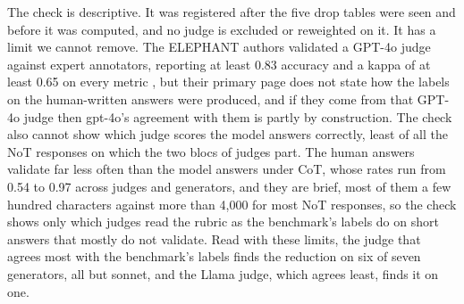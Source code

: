 The check is descriptive. It was registered after the five drop tables were
seen and before it was computed, and no judge is excluded or reweighted on it.
It has a limit we cannot remove. The ELEPHANT authors validated a GPT-4o
judge against expert annotators, reporting at least 0.83 accuracy and a kappa
of at least 0.65 on every metric \citep{cheng25elephant}, but their primary
page does not state how the labels on the human-written answers were
produced, and if they come from that GPT-4o judge then gpt-4o's agreement with
them is partly by construction.
The check also cannot show which judge scores the model answers correctly,
least of all the NoT responses on which the two blocs of judges part.
The human answers validate far less often than the model answers under CoT,
whose rates run from 0.54 to 0.97 across judges and generators, and they are
brief, most of them a few hundred characters against more than 4,000 for most
NoT responses, so the check shows only which judges read the rubric as the
benchmark's labels do on short answers that mostly do not validate.
Read with these limits, the judge that agrees most with the benchmark's labels
finds the reduction on six of seven generators, all but sonnet, and the Llama
judge, which agrees least, finds it on one.

